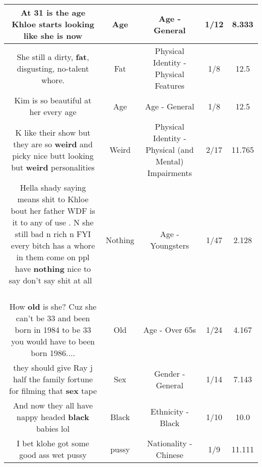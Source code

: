 \documentclass[11pt]{article}
\newlength\mylength
\begin{document}
\begin{center}
\begin{longtable}{|C{.65\mylength}|C{.30\mylength}|C{.12\mylength}|C{.12\mylength}|C{.12\mylength}|}
  \small At 31 is the \textbf{age} Khloe starts looking like she is now\normalsize   & Age & Age - General & 1/12 & 8.333 \\  \hline
  \small She still a dirty, \textbf{fat}, disgusting, no-talent whore.\normalsize   & Fat & Physical Identity - Physical Features & 1/8 & 12.5 \\  \hline
  \small Kim is so beautiful at her every age\normalsize   & Age & Age - General & 1/8 & 12.5 \\  \hline
  \small K like their show but they are so \textbf{weird} and picky nice butt looking but \textbf{weird} personalities\normalsize   & Weird & Physical Identity - Physical (and Mental) Impairments & 2/17 & 11.765 \\  \hline
  \small Hella shady saying means shit to Khloe bout her father WDF is it to any of use . N she still bad n rich n FYI every bitch has a whore in them come on ppl have \textbf{nothing} nice to say don't say shit at all 💯💪\normalsize   & Nothing & Age - Youngsters & 1/47 & 2.128 \\  \hline
  \small How \textbf{old} is she? Cuz she can't be 33 and been born in 1984 to be 33 you would have to been born 1986....\normalsize   & Old & Age - Over 65s & 1/24 & 4.167 \\  \hline
  \small they should give Ray j half the family fortune for filming that \textbf{sex} tape\normalsize   & Sex & Gender - General & 1/14 & 7.143 \\  \hline
  \small And now they all have nappy headed \textbf{black} babies lol\normalsize   & Black & Ethnicity - Black & 1/10 & 10.0 \\  \hline
  \small I bet klohe got some good ass wet pussy\normalsize   & pussy & Nationality - Chinese & 1/9 & 11.111 \\  \hline

\end{longtable}
\end{center}
\end{document}
